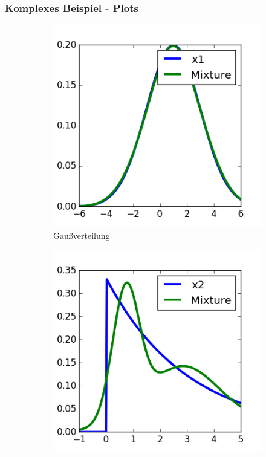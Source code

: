 \documentclass[11pt]{beamer}
\begin{document}
\begin{frame}
  \frametitle{Komplexes Beispiel - Plots}
  \vspace{-0.5em}
  \begin{figure}
    \centering
    \begin{subfigure}[t]{0.3\textwidth}
      \centering
      \includegraphics[width=\textwidth]{thesis/complex/introduction-var-x1}
      \caption{Gaußverteilung}
    \end{subfigure}
    \hfill
    \begin{subfigure}[t]{0.3\textwidth}
      \centering
      \includegraphics[width=\textwidth]{thesis/complex/introduction-var-x2}

\end{subfigure}
\end{figure}
\end{frame}
\end{document}
